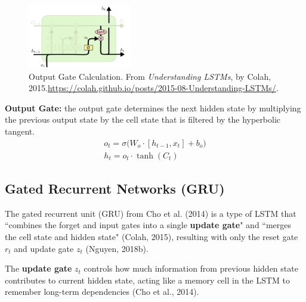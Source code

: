 \clearpage
\begin{program}
\begin{figure}
\vspace{-20pt}
\begin{center}
    \includegraphics[width=0.4\textwidth]{imgs/lstm_outputGate.png}    
\end{center}
\vspace{-20pt}
\caption{\footnotesize Output Gate Calculation. From \emph{Understanding LSTMs}, by Colah, 2015.\url{https://colah.github.io/posts/2015-08-Understanding-LSTMs/}. }
\vspace{-5pt}
\label{fig:outputGate}
\end{figure}

\textbf{Output Gate: }the output gate determines the next hidden state by multiplying the previous output state by the cell state that is filtered by the hyperbolic tangent.
$$
\begin{array}{ll}
o_t = \sigma \Big( W_o \cdot [h_{t-1}, x_t] + b_o \Big) \\
h_t = o_t \cdot \tanh(C_t)
\end{array}
$$ 
\newline\newline\newline\newline\newline
\end{program}



\subsection{Gated Recurrent Networks (GRU)} \label{sec:GRU}

The gated recurrent unit (GRU) from Cho et al. (2014) is a type of LSTM that ``combines the forget and input gates into a single \textbf{update gate}" and ``merges the cell state and hidden state" (Colah, 2015), resulting with only the reset gate $r_t$ and update gate $z_t$ (Nguyen, 2018b). 

The \textbf{update gate} $z_t$ controls how much information from previous hidden state contributes to current hidden state, acting like a memory cell in the LSTM to remember long-term dependencies (Cho et al., 2014). 

